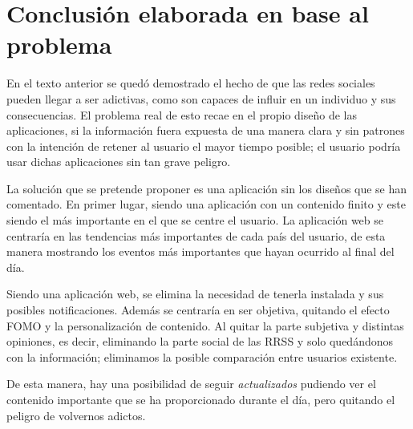 \section{Conclusión elaborada en base al problema}

En el texto anterior se quedó demostrado el hecho de que las redes sociales pueden llegar a ser adictivas, como son capaces de influir en un individuo y sus consecuencias. El problema real de esto recae en el propio diseño de las aplicaciones, 
si la información fuera expuesta de una manera clara y sin patrones con la intención de retener al usuario el mayor tiempo posible; el usuario podría usar dichas aplicaciones sin tan grave peligro.

\vspace{0.3cm}

La solución que se pretende proponer es una aplicación sin los diseños que se han comentado. En primer lugar, siendo una aplicación con un contenido finito y este siendo el más importante en el que se centre el usuario. La aplicación web se centraría en las tendencias más importantes de cada país del usuario, de esta manera mostrando los eventos más importantes que hayan ocurrido al final del día.

\vspace{0.3cm}

Siendo una aplicación web, se elimina la necesidad de tenerla instalada y sus posibles notificaciones. Además se centraría en ser objetiva, quitando el efecto \acs{FOMO} y la personalización de contenido. Al quitar la parte subjetiva y distintas opiniones, es decir, eliminando la parte social de las \acs{RRSS} y solo quedándonos con la información; eliminamos la posible comparación entre usuarios existente.

\vspace{0.3cm}

De esta manera, hay una posibilidad de seguir \textit{actualizados} pudiendo ver el contenido importante que se ha proporcionado durante el día, pero quitando el peligro de volvernos adictos.

